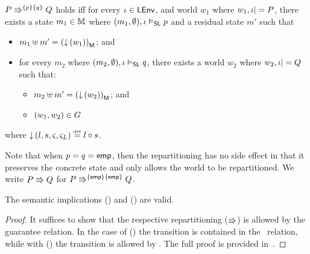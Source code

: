 \begin{definition}[Repartitioning] \label{def:repartitioning}
$\repartitions{P}{Q}{p}{q}$ holds iff for every $\lenv \in \LEnv$, and world $w_1$ where $w_1, \lenv |= P$, there exists a state $m_1 \in \Heaps$ where $(m_1, \emptyset), \lenv \slsat p$ and a residual state $m'$ such that 
%
\begin{itemize} 
	\item $m_1 \composeH m' = \heapPart{\left(\collapseW{w_1}\right)}$; and
	\item for every $m_2$ where $(m_2, \emptyset), \lenv \slsat q$, there exists a world $w_2$ where $w_2, \lenv |= Q$ such that:
	\begin{itemize}
		\item $m_2 \composeH m' = \heapPart{\left(\collapseW{w_2}\right)}$; and
		\item $(w_1, w_2) \in \guarantee$
	\end{itemize}	  
\end{itemize}
%
where $\collapseW{l, s, \amod{}, \amod{L}} \eqdef l \composeL s$.

Note that when $p = q = \emp$, then the repartitioning has no side effect in that it preserves the concrete state and only allows the world to be repartitioned. We write $P \semimplies Q$ for $\repartitions{P}{Q}{\emp}{\emp} $.
%	
\end{definition}
%
%
\begin{lemma}[]
The semantic implications (\extendRule) and (\shiftRule) are valid.
%
\begin{proof}
It suffices to show that the respective repartitioning ($\semimplies$) is allowed by the guarantee relation. In the case of (\extendRule) the transition is contained in the \extendG\ relation, while with (\shiftRule) the transition is allowed by \shiftG. The full proof is provided in~\cite{colosl-tr14}.
\renewcommand{\qed}{}
\end{proof}
%
\end{lemma}
%
%
